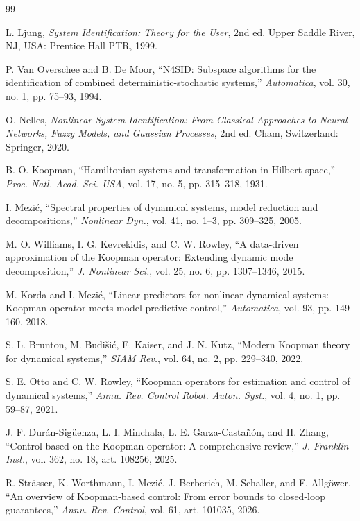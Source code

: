 \documentclass[journal]{IEEEtran}
\begin{document}
\begin{thebibliography}{99}

L. Ljung, \emph{System Identification: Theory for the User}, 2nd ed. Upper Saddle River, NJ, USA: Prentice Hall PTR, 1999.

P. Van Overschee and B. De Moor, ``N4SID: Subspace algorithms for the identification of combined deterministic-stochastic systems,'' \emph{Automatica}, vol. 30, no. 1, pp. 75--93, 1994.

O. Nelles, \emph{Nonlinear System Identification: From Classical Approaches to Neural Networks, Fuzzy Models, and Gaussian Processes}, 2nd ed. Cham, Switzerland: Springer, 2020.

B. O. Koopman, ``Hamiltonian systems and transformation in Hilbert space,'' \emph{Proc. Natl. Acad. Sci. USA}, vol. 17, no. 5, pp. 315--318, 1931.

I. Mezi\'c, ``Spectral properties of dynamical systems, model reduction and decompositions,'' \emph{Nonlinear Dyn.}, vol. 41, no. 1--3, pp. 309--325, 2005.

M. O. Williams, I. G. Kevrekidis, and C. W. Rowley, ``A data-driven approximation of the Koopman operator: Extending dynamic mode decomposition,'' \emph{J. Nonlinear Sci.}, vol. 25, no. 6, pp. 1307--1346, 2015.

M. Korda and I. Mezi\'c, ``Linear predictors for nonlinear dynamical systems: Koopman operator meets model predictive control,'' \emph{Automatica}, vol. 93, pp. 149--160, 2018.

S. L. Brunton, M. Budi\v{s}i\'c, E. Kaiser, and J. N. Kutz, ``Modern Koopman theory for dynamical systems,'' \emph{SIAM Rev.}, vol. 64, no. 2, pp. 229--340, 2022.

S. E. Otto and C. W. Rowley, ``Koopman operators for estimation and control of dynamical systems,'' \emph{Annu. Rev. Control Robot. Auton. Syst.}, vol. 4, no. 1, pp. 59--87, 2021.

J. F. Dur\'an-Sig\"uenza, L. I. Minchala, L. E. Garza-Casta\~n\'on, and H. Zhang, ``Control based on the Koopman operator: A comprehensive review,'' \emph{J. Franklin Inst.}, vol. 362, no. 18, art. 108256, 2025.

R. Str\"asser, K. Worthmann, I. Mezi\'c, J. Berberich, M. Schaller, and F. Allg\"ower, ``An overview of Koopman-based control: From error bounds to closed-loop guarantees,'' \emph{Annu. Rev. Control}, vol. 61, art. 101035, 2026.


\end{thebibliography}
\end{document}
